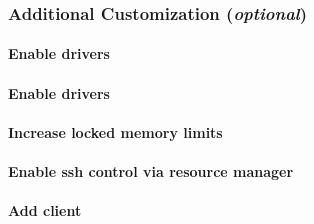 \documentclass[letterpaper]{article}
\begin{document}



\subsubsection{Additional Customization ({\em optional})} \label{sec:addl_customizations}


\paragraph{Enable \InfiniBand{} drivers}


\paragraph{Enable \OmniPath{} drivers}


\paragraph{Increase locked memory limits}


\paragraph{Enable ssh control via resource manager} 



\paragraph{Add \Lustre{} client} \label{sec:lustre_client}

\vspace*{0.25cm}


\end{document}
